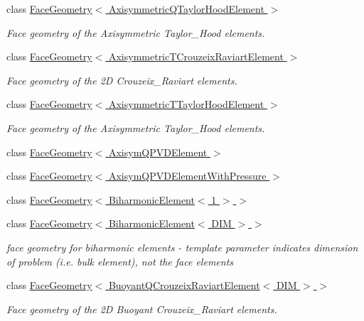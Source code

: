\begin{DoxyCompactItemize}
class \hyperlink{classoomph_1_1FaceGeometry_3_01AxisymmetricQTaylorHoodElement_01_4}{Face\+Geometry$<$ Axisymmetric\+Q\+Taylor\+Hood\+Element $>$}
\begin{DoxyCompactList}\small\item\em Face geometry of the Axisymmetric Taylor\+\_\+\+Hood elements. \end{DoxyCompactList}\item 
class \hyperlink{classoomph_1_1FaceGeometry_3_01AxisymmetricTCrouzeixRaviartElement_01_4}{Face\+Geometry$<$ Axisymmetric\+T\+Crouzeix\+Raviart\+Element $>$}
\begin{DoxyCompactList}\small\item\em Face geometry of the 2D Crouzeix\+\_\+\+Raviart elements. \end{DoxyCompactList}\item 
class \hyperlink{classoomph_1_1FaceGeometry_3_01AxisymmetricTTaylorHoodElement_01_4}{Face\+Geometry$<$ Axisymmetric\+T\+Taylor\+Hood\+Element $>$}
\begin{DoxyCompactList}\small\item\em Face geometry of the Axisymmetric Taylor\+\_\+\+Hood elements. \end{DoxyCompactList}\item 
class \hyperlink{classoomph_1_1FaceGeometry_3_01AxisymQPVDElement_01_4}{Face\+Geometry$<$ Axisym\+Q\+P\+V\+D\+Element $>$}
\item 
class \hyperlink{classoomph_1_1FaceGeometry_3_01AxisymQPVDElementWithPressure_01_4}{Face\+Geometry$<$ Axisym\+Q\+P\+V\+D\+Element\+With\+Pressure $>$}
\item 
class \hyperlink{classoomph_1_1FaceGeometry_3_01BiharmonicElement_3_011_01_4_01_4}{Face\+Geometry$<$ Biharmonic\+Element$<$ 1 $>$ $>$}
\item 
class \hyperlink{classoomph_1_1FaceGeometry_3_01BiharmonicElement_3_01DIM_01_4_01_4}{Face\+Geometry$<$ Biharmonic\+Element$<$ D\+I\+M $>$ $>$}
\begin{DoxyCompactList}\small\item\em face geometry for biharmonic elements -\/ template parameter indicates dimension of problem (i.\+e. bulk element), not the face elements \end{DoxyCompactList}\item 
class \hyperlink{classoomph_1_1FaceGeometry_3_01BuoyantQCrouzeixRaviartElement_3_01DIM_01_4_01_4}{Face\+Geometry$<$ Buoyant\+Q\+Crouzeix\+Raviart\+Element$<$ D\+I\+M $>$ $>$}
\begin{DoxyCompactList}\small\item\em Face geometry of the 2D Buoyant Crouzeix\+\_\+\+Raviart elements. \end{DoxyCompactList}\item 

\end{DoxyCompactItemize}
